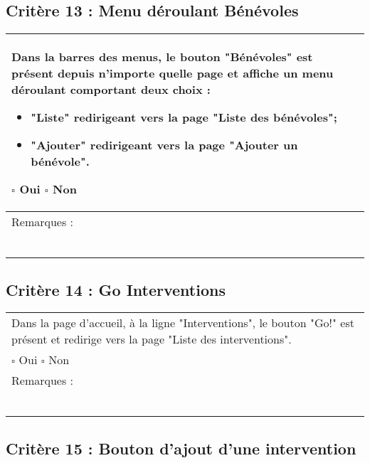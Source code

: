   		
  			\subsection*{Critère 13 : Menu déroulant Bénévoles}
	
	\begin{center}
    	 		\begin{tabular}[h]{|p{}|}
			\hline
				Dans la barres des menus, le bouton "Bénévoles" est présent depuis n'importe quelle page et affiche un menu déroulant comportant deux choix : 
				\begin{itemize}
					\item "Liste" redirigeant vers la page "Liste des bénévoles";
					\item "Ajouter" redirigeant vers la page "Ajouter un bénévole".
				\end{itemize}
				$\square$ Oui  \hfill \hfill $\square$ Non \\\hline Remarques : \\ ~\\
			 \\\hline
     		\end{tabular}
  		\end{center}
  		
  		
  			
  		
  		\subsection*{Critère 14 : Go Interventions}
	
	\begin{center}
    	 		\begin{tabular}[h]{|p{}|}
			\hline
				Dans la page d'accueil, à la ligne "Interventions", le bouton "Go!" est présent et redirige vers la page "Liste des interventions".\\
				$\square$ Oui  \hfill \hfill $\square$ Non \\\hline Remarques : \\ ~\\
			 \\\hline
     		\end{tabular}
  		\end{center}	
  		
  		
  	\subsection*{Critère 15 : Bouton d'ajout d'une intervention}
	
